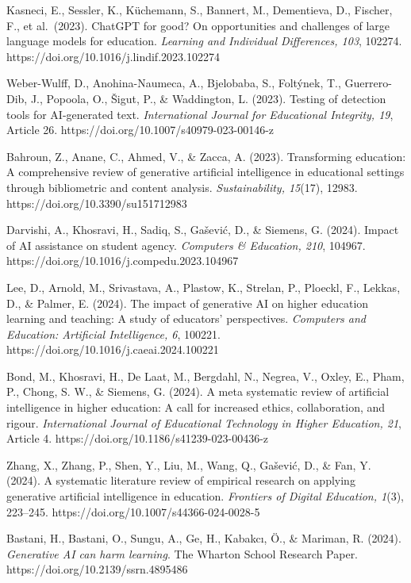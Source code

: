 \documentclass[
  spanish,
  letterpaper,
  DIV=11,
  numbers=noendperiod]{scrartcl}
\begin{document}
Kasneci, E., Sessler, K., Küchemann, S., Bannert, M., Dementieva, D.,
Fischer, F., et al.~(2023). ChatGPT for good? On opportunities and
challenges of large language models for education. \emph{Learning and
Individual Differences, 103}, 102274.
https://doi.org/10.1016/j.lindif.2023.102274

Weber-Wulff, D., Anohina-Naumeca, A., Bjelobaba, S., Foltýnek, T.,
Guerrero-Dib, J., Popoola, O., Šigut, P., \& Waddington, L. (2023).
Testing of detection tools for AI-generated text. \emph{International
Journal for Educational Integrity, 19}, Article 26.
https://doi.org/10.1007/s40979-023-00146-z

Bahroun, Z., Anane, C., Ahmed, V., \& Zacca, A. (2023). Transforming
education: A comprehensive review of generative artificial intelligence
in educational settings through bibliometric and content analysis.
\emph{Sustainability, 15}(17), 12983.
https://doi.org/10.3390/su151712983

Darvishi, A., Khosravi, H., Sadiq, S., Gašević, D., \& Siemens, G.
(2024). Impact of AI assistance on student agency. \emph{Computers \&
Education, 210}, 104967. https://doi.org/10.1016/j.compedu.2023.104967

Lee, D., Arnold, M., Srivastava, A., Plastow, K., Strelan, P., Ploeckl,
F., Lekkas, D., \& Palmer, E. (2024). The impact of generative AI on
higher education learning and teaching: A study of educators'
perspectives. \emph{Computers and Education: Artificial Intelligence,
6}, 100221. https://doi.org/10.1016/j.caeai.2024.100221

Bond, M., Khosravi, H., De Laat, M., Bergdahl, N., Negrea, V., Oxley,
E., Pham, P., Chong, S. W., \& Siemens, G. (2024). A meta systematic
review of artificial intelligence in higher education: A call for
increased ethics, collaboration, and rigour. \emph{International Journal
of Educational Technology in Higher Education, 21}, Article 4.
https://doi.org/10.1186/s41239-023-00436-z

Zhang, X., Zhang, P., Shen, Y., Liu, M., Wang, Q., Gašević, D., \& Fan,
Y. (2024). A systematic literature review of empirical research on
applying generative artificial intelligence in education.
\emph{Frontiers of Digital Education, 1}(3), 223--245.
https://doi.org/10.1007/s44366-024-0028-5

Bastani, H., Bastani, O., Sungu, A., Ge, H., Kabakcı, Ö., \& Mariman, R.
(2024). \emph{Generative AI can harm learning}. The Wharton School
Research Paper. https://doi.org/10.2139/ssrn.4895486
\end{document}
